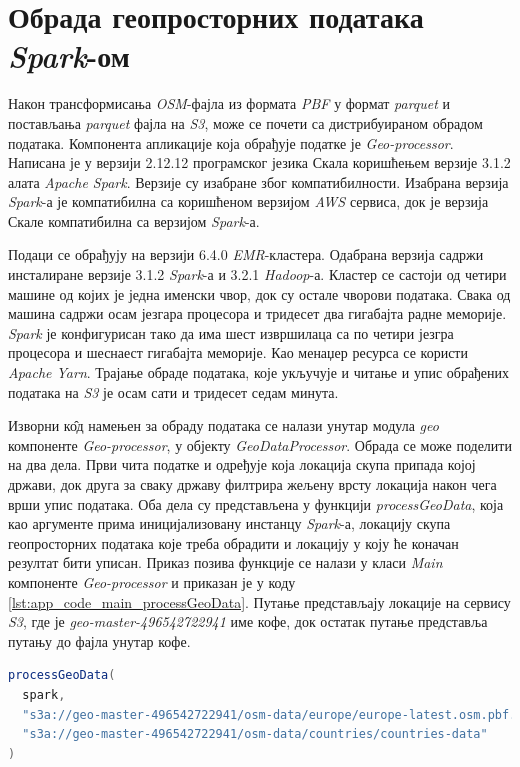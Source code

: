 \documentclass[12pt,oneside]{memoir}
\begin{document}
\section{Обрада геопросторних података \textit{Spark}-ом}
\label{sec:osm_spark_obrada}

Након трансформисања \textit{OSM}-фајла из формата \textit{PBF} у формат \textit{parquet} и постављања \textit{parquet} фајла на \textit{S3}, може се почети са дистрибуираном обрадом података. Компонента апликације која обрађује податке је \textit{Geo-processor}. Написана је у верзији 2.12.12 програмског језика Скала коришћењем верзије 3.1.2 алата \textit{Apache Spark}. Верзије су изабране због компатибилности. Изабрана верзија \textit{Spark}-а је компатибилна са коришћеном верзијом \textit{AWS} сервиса, док је верзија Скале компатибилна са верзијом \textit{Spark}-а.

Подаци се обрађују на верзији 6.4.0 \textit{EMR}-кластера. Одабрана верзија садржи инсталиране верзије 3.1.2 \textit{Spark}-а и 3.2.1 \textit{Hadoop}-а. Кластер се састоји од четири машине од којих је једна именски чвор, док су остале чворови података. Свака од машина садржи осам језгара процесора и тридесет два гигабајта радне меморије. \textit{Spark} је конфигурисан тако да има шест извршилаца са по четири језгра процесора и шеснаест гигабајта меморије. Као менаџер ресурса се користи \textit{Apache Yarn}.
Трајање обраде података, које укључује и читање и упис обрађених података на \textit{S3} је осам сати и тридесет седам минута.

Изворни к\^{о}д намењен за обраду података се налази унутар модула	 \textit{geo} компоненте \textit{Geo-processor}, у објекту \textit{GeoDataProcessor}. Обрада се може поделити на два дела. Први чита податке и одређује која локација скупа припада којој држави, док друга за сваку државу филтрира жељену врсту локација након чега врши упис података. Оба дела су представљена у функцији \textit{processGeoData}, која као аргументе прима иницијализовану инстанцу \textit{Spark}-а, локацију скупа геопросторних података које треба обрадити и локацију у коју ће коначан резултат бити уписан. Приказ позива функције се налази у класи \textit{Main} компоненте \textit{Geo-processor} и приказан је у коду \ref{lst:app_code_main_processGeoData}. Путање представљају локације на сервису \textit{S3}, где је \textit{geo-master-496542722941} име кофе, док остатак путање представља путању до фајла унутар кофе.

\begin{lstlisting}[caption={Позивање функције која започиње обраду података}, language=Scala, label={lst:app_code_main_processGeoData}]
processGeoData(
  spark,
  "s3a://geo-master-496542722941/osm-data/europe/europe-latest.osm.pbf.node.parquet",
  "s3a://geo-master-496542722941/osm-data/countries/countries-data"
)
\end{lstlisting}
\end{document}
